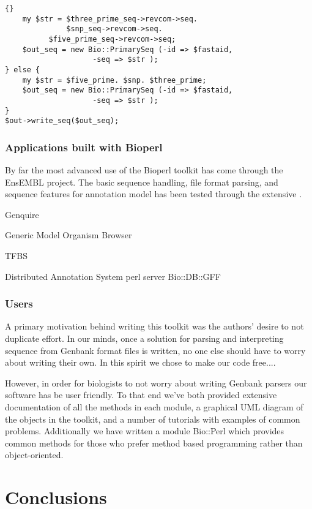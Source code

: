 \documentclass[twocolumn]{article}
\begin{document}
\begin{itemize}
\begin{scriptsize}
\begin{lstlisting}{}
    my $str = $three_prime_seq->revcom->seq. 
              $snp_seq->revcom->seq. 
	      $five_prime_seq->revcom->seq;
    $out_seq = new Bio::PrimarySeq (-id => $fastaid,
				    -seq => $str );
} else {
    my $str = $five_prime. $snp. $three_prime;
    $out_seq = new Bio::PrimarySeq (-id => $fastaid,
				    -seq => $str );
}
$out->write_seq($out_seq);

\end{lstlisting}
\end{scriptsize}

\end{itemize}

\subsubsection{Applications built with Bioperl}

By far the most advanced use of the Bioperl toolkit has come through
the EnsEMBL project.  The basic sequence handling, file format
parsing, and sequence features for annotation model has been tested
through the extensive .

Genquire\cite{genquire}

Generic Model Organism Browser \cite{gmod}

TFBS \cite{tfbs}

Distributed Annotation System perl server Bio::DB::GFF \cite{das,biodbgff}

\subsubsection{Users}

A primary motivation behind writing this toolkit was the authors'
desire to not duplicate effort.  In our minds, once a solution for
parsing and interpreting sequence from Genbank format files is
written, no one else should have to worry about writing their own.  In
this spirit we chose to make our code free....

However, in order for biologists to not worry about writing Genbank
parsers our software has be user friendly.  To that end we've both
provided extensive documentation of all the methods in each module, a
graphical UML diagram of the objects in the toolkit, and a number of
tutorials with examples of common problems.  Additionally we have
written a module Bio::Perl which provides common methods for those who
prefer method based programming rather than object-oriented.

\section{Conclusions}
\end{document}
